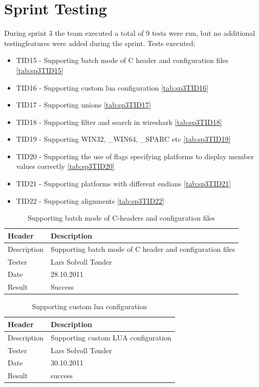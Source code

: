 \section{Sprint Testing}
During sprint 3 the team executed a total of 9 tests were run, but no additional testingfeatures were added during the sprint. Tests executed:

\begin{itemize}
	\item TID15 - Supporting batch mode of C header and configuration files \autoref{tab:sp3TID15}
	\item TID16 - Supporting custom \Gls{lua} configuration \autoref{tab:sp3TID16}
	\item TID17 - Supporting unions \autoref{tab:sp3TID17}
	\item TID18 - Supporting filter and search in wireshark \autoref{tab:sp3TID18}
	\item TID19 - Supporting WIN32, \_WIN64, \_SPARC etc \autoref{tab:sp3TID19}
	\item TID20 -  Supporting the use of flags specifying platforms to display member values correctly \autoref{tab:sp3TID20}
	\item TID21 - Supporting platforms with different \glspl{endian} \autoref{tab:sp3TID21}
	\item TID22 - Supporting alignments \autoref{tab:sp3TID22}
\end{itemize}

\begin{table}[!htb] \footnotesize \center
\caption{Supporting batch mode of C-headers and configuration files\label{tab:sp3TID15}}
\begin{tabular}{l l}
	\toprule
	Header & Description \\
	\midrule
	Description & Supporting batch mode of C header and configuration files \\
	Tester & Lars Solvoll Tønder \\
	Date & 28.10.2011 \\
	Result & Success\\
	\bottomrule
\end{tabular}
\end{table}

\begin{table}[!htb] \footnotesize \center
\caption{Supporting custom \Gls{lua} configuration\label{tab:sp3TID16}}
\begin{tabular}{l l}
	\toprule
	Header & Description \\
	\midrule
	Description & Supporting custom LUA configuration\\
	Tester & Lars Solvoll Tønder \\
	Date & 30.10.2011\\
	Result & success\\
	\bottomrule
\end{tabular}
\end{table}

